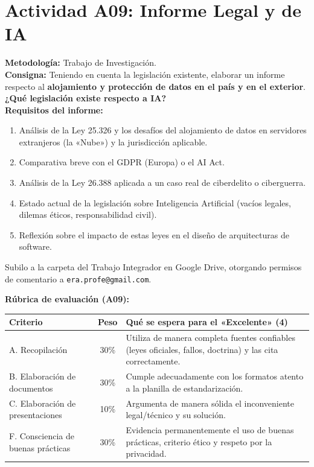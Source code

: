 \documentclass[11pt,a4paper]{article}
\begin{document}
\section{Actividad A09: Informe Legal y de IA}

\begin{clave}
\textbf{Metodología:} Trabajo de Investigación.\\[0.2cm]
\textbf{Consigna:} Teniendo en cuenta la legislación existente, elaborar un informe respecto al \textbf{alojamiento y protección de datos en el país y en el exterior}. \textbf{¿Qué legislación existe respecto a IA?}\\[0.2cm]
\textbf{Requisitos del informe:}
\begin{enumerate}[leftmargin=*]
  \item Análisis de la Ley 25.326 y los desafíos del alojamiento de datos en servidores extranjeros (la «Nube») y la jurisdicción aplicable.
  \item Comparativa breve con el GDPR (Europa) o el AI Act.
  \item Análisis de la Ley 26.388 aplicada a un caso real de ciberdelito o ciberguerra.
  \item Estado actual de la legislación sobre Inteligencia Artificial (vacíos legales, dilemas éticos, responsabilidad civil).
  \item Reflexión sobre el impacto de estas leyes en el diseño de arquitecturas de software.
\end{enumerate}
Subilo a la carpeta del Trabajo Integrador en Google Drive, otorgando permisos de comentario a \texttt{era.profe@gmail.com}.
\end{clave}

\textbf{Rúbrica de evaluación (A09):}
\begin{center}
\renewcommand{\arraystretch}{1.2}
\begin{tabularx}{\textwidth}{@{} l c X @{}}
\toprule
\textbf{Criterio} & \textbf{Peso} & \textbf{Qué se espera para el «Excelente» (4)} \\
\midrule
A. Recopilación & 30\% & Utiliza de manera completa fuentes confiables (leyes oficiales, fallos, doctrina) y las cita correctamente. \\
B. Elaboración de documentos & 30\% & Cumple adecuadamente con los formatos atento a la planilla de estandarización. \\
C. Elaboración de presentaciones & 10\% & Argumenta de manera sólida el inconveniente legal/técnico y su solución. \\
F. Consciencia de buenas prácticas & 30\% & Evidencia permanentemente el uso de buenas prácticas, criterio ético y respeto por la privacidad. \\
\bottomrule
\end{tabularx}
\end{center}
\end{document}
